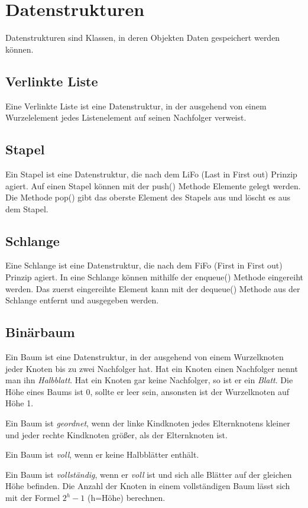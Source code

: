 \documentclass{article}
\begin{document}
\section*{Datenstrukturen}
Datenstrukturen sind Klassen, in deren Objekten Daten gespeichert werden können.
\subsection*{Verlinkte Liste}
Eine Verlinkte Liste ist eine Datenstruktur, in der ausgehend von einem Wurzelelement
jedes Listenelement auf seinen Nachfolger verweist.
\subsection*{Stapel}
Ein Stapel ist eine Datenstruktur, die nach dem LiFo (Last in First out) Prinzip agiert.
Auf einen Stapel können mit der push() Methode Elemente gelegt werden. Die Methode
pop() gibt das oberste Element des Stapels aus und löscht es aus dem Stapel.
\subsection*{Schlange}
Eine Schlange ist eine Datenstruktur, die nach dem FiFo (First in First out) Prinzip agiert.
In eine Schlange können mithilfe der enqueue() Methode eingereiht werden. Das zuerst eingereihte
Element kann mit der dequeue() Methode aus der Schlange entfernt und ausgegeben werden.
\subsection*{Binärbaum}
Ein Baum ist eine Datenstruktur, in der ausgehend von einem Wurzelknoten jeder Knoten bis zu 
zwei Nachfolger hat. Hat ein Knoten einen Nachfolger nennt man ihn \emph{Halbblatt}. Hat ein Knoten
gar keine Nachfolger, so ist er ein \emph{Blatt}. Die Höhe eines Baums ist 0, sollte er leer sein,
ansonsten ist der Wurzelknoten auf Höhe 1.

Ein Baum ist \emph{geordnet}, wenn der linke Kindknoten jedes Elternknotens kleiner und jeder rechte
Kindknoten größer, als der Elternknoten ist.

Ein Baum ist \emph{voll}, wenn er keine Halbblätter enthält.

Ein Baum ist \emph{vollständig}, wenn er \emph{voll} ist und sich alle Blätter auf der gleichen Höhe befinden. 
Die Anzahl der Knoten in einem vollständigen Baum lässt sich mit der Formel $2^h-1$ (h=Höhe) berechnen.
\end{document}
